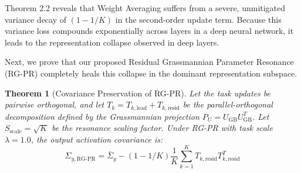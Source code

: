 \documentclass{article}
\theoremstyle{plain}
\newtheorem{theorem}{Theorem}[section]
\theoremstyle{definition}
\theoremstyle{remark}
\begin{document}
Theorem 2.2 reveals that Weight Averaging suffers from a severe, unmitigated variance decay of $(1 - 1/K)$ in the second-order update term. Because this variance loss compounds exponentially across layers in a deep neural network, it leads to the representation collapse observed in deep layers.

Next, we prove that our proposed Residual Grassmannian Parameter Resonance (RG-PR) completely heals this collapse in the dominant representation subspace.

\begin{theorem}[Covariance Preservation of RG-PR]
Let the task updates be pairwise orthogonal, and let $T_k = T_{k, \text{lead}} + T_{k, \text{resid}}$ be the parallel-orthogonal decomposition defined by the Grassmannian projection $P_U = U_{\text{GB}} U_{\text{GB}}^T$. Let $S_{\text{scale}} = \sqrt{K}$ be the resonance scaling factor. Under RG-PR with task scale $\lambda = 1.0$, the output activation covariance is:
\begin{equation}
    \Sigma_{y, \text{RG-PR}} = \bar{\Sigma}_y - (1 - 1/K) \frac{1}{K} \sum_{k=1}^K T_{k, \text{resid}} T_{k, \text{resid}}^T
\end{equation}
\end{theorem}
\end{document}
